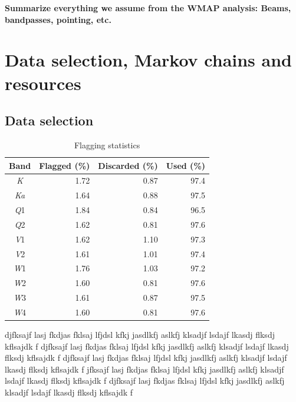\documentclass[twocolumn]{../../common/aa}
\newcommand{\K}[0]{\textit K}
\newcommand{\Ka}[0]{\textit{Ka}}
\newcommand{\Q}[0]{\textit Q}
\newcommand{\V}[0]{\textit V}
\newcommand{\W}[0]{\textit W}
\begin{document}
\textbf{Summarize everything we assume from the WMAP analysis: Beams, bandpasses, pointing, etc.}



\section{Data selection, Markov chains and resources}
\label{sec:markov_chains}

\subsection{Data selection}

\begin{table}
\caption{Flagging statistics}              %
\label{table:flagged_data}      %
\centering                                      %
\begin{tabular}{c r r r}          %
\hline\hline                        %
	Band & Flagged (\%) & Discarded (\%) & Used (\%) \\    %
\hline                                   %
	\K  &  1.72 & 0.87 & 97.4\\
	\Ka &  1.64 & 0.88 & 97.5\\      %
	\Q1 &  1.84 & 0.84 & 96.5\\
	\Q2 &  1.62 & 0.81 & 97.6\\
	\V1 &  1.62 & 1.10 & 97.3\\
	\V2 &  1.61 & 1.01 & 97.4\\
	\W1 &  1.76 & 1.03 & 97.2\\
	\W2 &  1.60 & 0.81 & 97.6\\
	\W3 &  1.61 & 0.87 & 97.5\\
	\W4 &  1.60 & 0.81 & 97.6\\
\hline                                             %
\end{tabular}
\end{table}

djfksajf lasj fkdjas fklsaj lfjdsl kfkj jasdlkfj aslkfj klsadjf lsdajf lkasdj flksdj kflsajdk f
djfksajf lasj fkdjas fklsaj lfjdsl kfkj jasdlkfj aslkfj klsadjf lsdajf lkasdj flksdj kflsajdk f
djfksajf lasj fkdjas fklsaj lfjdsl kfkj jasdlkfj aslkfj klsadjf lsdajf lkasdj flksdj kflsajdk f
jfksajf lasj fkdjas fklsaj lfjdsl kfkj jasdlkfj aslkfj klsadjf lsdajf lkasdj flksdj kflsajdk f
djfksajf lasj fkdjas fklsaj lfjdsl kfkj jasdlkfj aslkfj klsadjf lsdajf lkasdj flksdj kflsajdk f
\end{document}
